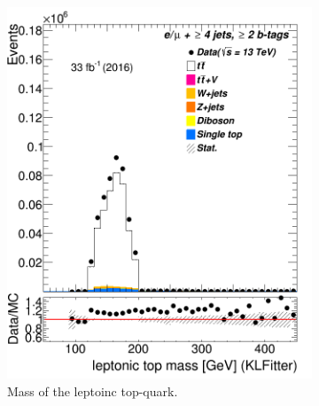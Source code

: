 \begin{figure}
\begin{subfigure}{0.35\textwidth}
		\includegraphics[width=\linewidth]{ControlPlots_emujets_2016_4incl_2incl/klf_topLep_m_emujets_2016.png}
		\caption{Mass of the leptoinc top-quark.} \label{fig:26}
	\end{subfigure}
	\medskip
	\begin{subfigure}{0.35\textwidth}

\end{subfigure}
\end{figure}
